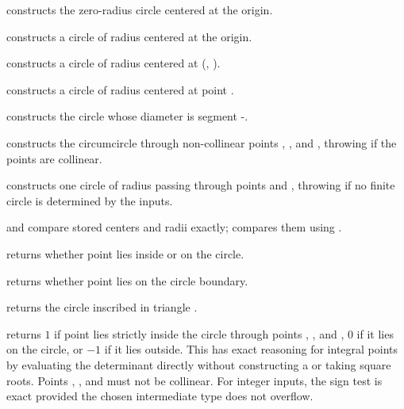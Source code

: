 \begin{compactitem}
  \item {} constructs the zero-radius circle centered at the origin.
  \item {} constructs a circle of radius  centered at the origin.
  \item {} constructs a circle of radius  centered at (, ).
  \item {} constructs a circle of radius  centered at point .
  \item {} constructs the circle whose diameter is segment -.
  \item {} constructs the circumcircle through non-collinear points , , and , throwing if the points are collinear.
  \item {} constructs one circle of radius  passing through points  and , throwing if no finite circle is determined by the inputs.
  \item {} and  compare stored centers and radii exactly;  compares them using .
  \item {} returns whether point  lies inside or on the circle.
  \item {} returns whether point  lies on the circle boundary.
  \item {} returns the circle inscribed in triangle .
  \item {} returns $1$ if point  lies strictly inside the circle through points , , and , $0$ if it lies on the circle, or $-1$ if it lies outside. This has exact reasoning for integral points by evaluating the determinant directly without constructing a  or taking square roots. Points , , and  must not be collinear. For integer inputs, the sign test is exact provided the chosen intermediate type does not overflow.
\end{compactitem}

